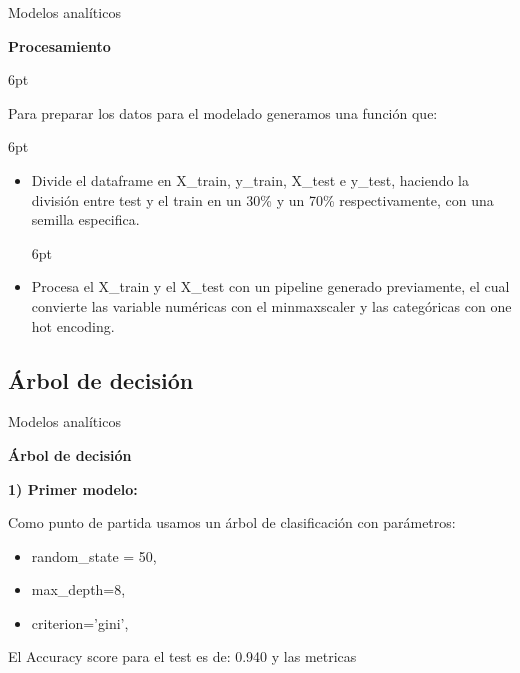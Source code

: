 \documentclass[pdf]{beamer}
\def\vspace{}%
\begin{document}
{\begin{frame}{Modelos analíticos}

    \begin{Large}
        \textbf{Procesamiento}
    \end{Large}
    \vspace{6pt}

    Para preparar los datos para el modelado generamos una función que:
    
    \vspace{6pt}
    \begin{itemize}
        \justifying%
        \item  Divide el dataframe en X\_train, y\_train, X\_test e y\_test, haciendo la división entre test y el train en un 30\% y un 70\% respectivamente, con una semilla especifica.
        
        \vspace{6pt}
        \item  Procesa el X\_train y el X\_test con un pipeline generado previamente, el cual convierte las variable numéricas con el minmaxscaler y las categóricas con one hot encoding.
    \end{itemize}



\end{frame}

    \subsection{Árbol de decisión}

        

\begin{frame}{Modelos analíticos}

    \begin{Large}
        \textbf{Árbol de decisión}
    \end{Large}

     \textbf{1) Primer modelo:}

    Como punto de partida usamos un árbol de clasificación con parámetros:
    \begin{itemize}
        \item random\_state = 50,
        \item max\_depth=8,
        \item criterion='gini',
    \end{itemize}

    El Accuracy score para el test es de: 0.940 y las metricas


\end{frame}}
\end{document}
